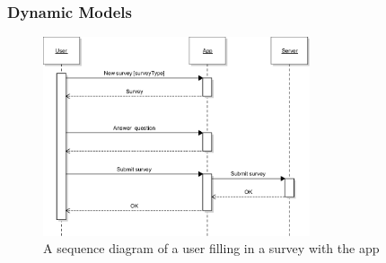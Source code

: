 \documentclass[a4paper, 11pt, titlepage]{article}
\begin{document}
\subsubsection{Dynamic Models}
\begin{figure}[H]
	\centering
	\includegraphics[width=0.7\textwidth]{figures/sequence-diagrams/AppSurveySeq.pdf}
	\caption{A sequence diagram of a user filling in a survey with the app}
\end{figure}
\end{document}
